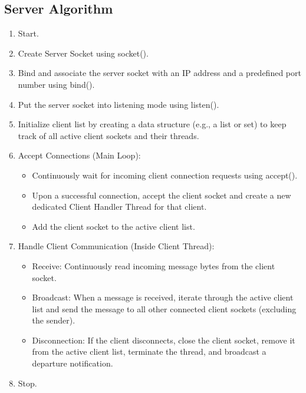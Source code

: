 \documentclass[12pt, a4paper]{report}
\begin{document}
\subsection*{Server Algorithm}
\begin{enumerate}
	\item Start.
	\item Create Server Socket using socket().
	\item Bind and associate the server socket with an IP address and a predefined port number using bind().
	\item Put the server socket into listening mode using listen().
	\item Initialize client list by creating a data structure (e.g., a list or set) to keep track of all active client sockets and their threads.
	\item Accept Connections (Main Loop):
	\begin{itemize}
		\item Continuously wait for incoming client connection requests using accept().
		\item Upon a successful connection, accept the client socket and create a new dedicated Client Handler Thread for that client.
		\item Add the client socket to the active client list.
	\end{itemize}
	\item Handle Client Communication (Inside Client Thread):
	\begin{itemize}
		\item Receive: Continuously read incoming message bytes from the client socket.
		\item Broadcast: When a message is received, iterate through the active client list and send the message to all other connected client sockets (excluding the sender).
		\item Disconnection: If the client disconnects, close the client socket, remove it from the active client list, terminate the thread, and broadcast a departure notification.
	\end{itemize}
	\item Stop.
\end{enumerate}
\end{document}

